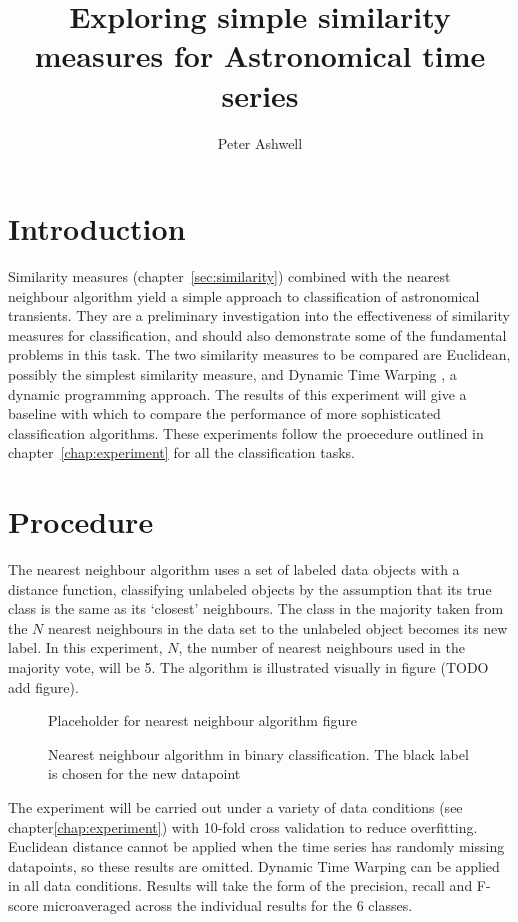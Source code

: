 \documentclass[10pt]{article}
\title{Exploring simple similarity measures for Astronomical time series}
\author{Peter Ashwell}
\date{}
\begin{document}
	\maketitle
	
	\section{Introduction}
		\label{sec:introduction}
		Similarity measures (chapter~\ref{sec:similarity}) combined with the nearest neighbour algorithm yield a simple approach to classification of astronomical transients. They are a preliminary investigation into the effectiveness of similarity measures for classification, and should also demonstrate some of the fundamental problems in this task. The two similarity measures to be compared are Euclidean, possibly the simplest similarity measure, and Dynamic Time Warping \citep{berndt1994using}, a dynamic programming approach. The results of this experiment will give a baseline with which to compare the performance of more sophisticated classification algorithms. These experiments follow the proecedure outlined in chapter~\ref{chap:experiment} for all the classification tasks. 
	
	\section{Procedure}
		\label{sec:procedure}
		The nearest neighbour algorithm uses a set of labeled data objects with a distance function, classifying unlabeled objects by the assumption that its true class is the same as its `closest' neighbours. The class in the majority taken from the $N$ nearest neighbours in the data set to the unlabeled object becomes its new label. In this experiment, $N$, the number of nearest neighbours used in the majority vote, will be 5. The algorithm is illustrated visually in figure (TODO add figure).
		
		\begin{figure}[ht!]
			\centering
			Placeholder for nearest neighbour algorithm figure
			\caption{Nearest neighbour algorithm in binary classification. The black label is chosen for the new datapoint}
		\end{figure}
		
		The experiment will be carried out under a variety of data conditions (see chapter\ref{chap:experiment}) with 10-fold cross validation to reduce overfitting. Euclidean distance cannot be applied when the time series has randomly missing datapoints, so these results are omitted. Dynamic Time Warping can be applied in all data conditions. Results will take the form of the precision, recall and F-score microaveraged across the individual results for the 6 classes. 
\end{document}
